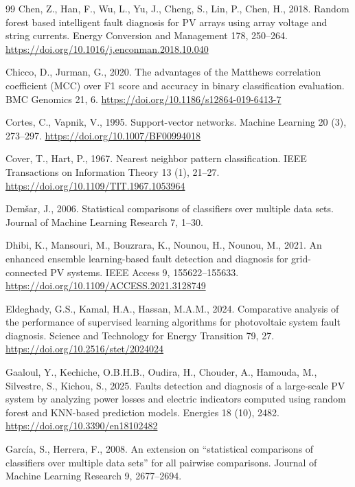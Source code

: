 \documentclass[11pt,a4paper]{article}
\begin{document}
\begin{thebibliography}{99}
Chen, Z., Han, F., Wu, L., Yu, J., Cheng, S., Lin, P., Chen, H., 2018. Random forest based intelligent fault diagnosis for PV arrays using array voltage and string currents. Energy Conversion and Management 178, 250--264. \url{https://doi.org/10.1016/j.enconman.2018.10.040}

Chicco, D., Jurman, G., 2020. The advantages of the Matthews correlation coefficient (MCC) over F1 score and accuracy in binary classification evaluation. BMC Genomics 21, 6. \url{https://doi.org/10.1186/s12864-019-6413-7}

Cortes, C., Vapnik, V., 1995. Support-vector networks. Machine Learning 20 (3), 273--297. \url{https://doi.org/10.1007/BF00994018}

Cover, T., Hart, P., 1967. Nearest neighbor pattern classification. IEEE Transactions on Information Theory 13 (1), 21--27. \url{https://doi.org/10.1109/TIT.1967.1053964}

Dem\v{s}ar, J., 2006. Statistical comparisons of classifiers over multiple data sets. Journal of Machine Learning Research 7, 1--30.

Dhibi, K., Mansouri, M., Bouzrara, K., Nounou, H., Nounou, M., 2021. An enhanced ensemble learning-based fault detection and diagnosis for grid-connected PV systems. IEEE Access 9, 155622--155633. \url{https://doi.org/10.1109/ACCESS.2021.3128749}

Eldeghady, G.S., Kamal, H.A., Hassan, M.A.M., 2024. Comparative analysis of the performance of supervised learning algorithms for photovoltaic system fault diagnosis. Science and Technology for Energy Transition 79, 27. \url{https://doi.org/10.2516/stet/2024024}

Gaaloul, Y., Kechiche, O.B.H.B., Oudira, H., Chouder, A., Hamouda, M., Silvestre, S., Kichou, S., 2025. Faults detection and diagnosis of a large-scale PV system by analyzing power losses and electric indicators computed using random forest and KNN-based prediction models. Energies 18 (10), 2482. \url{https://doi.org/10.3390/en18102482}

Garc\'ia, S., Herrera, F., 2008. An extension on ``statistical comparisons of classifiers over multiple data sets'' for all pairwise comparisons. Journal of Machine Learning Research 9, 2677--2694.


\end{thebibliography}
\end{document}
